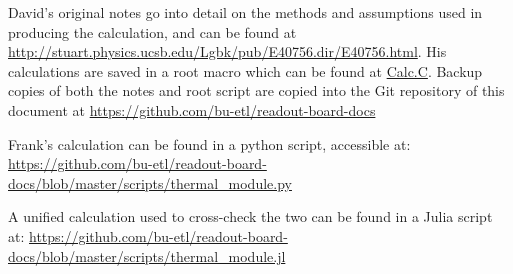 \documentclass[11pt]{article}
\begin{document}
David's original notes go into detail on the methods and assumptions used in producing the calculation, and can be found at \url{http://stuart.physics.ucsb.edu/Lgbk/pub/E40756.dir/E40756.html}.
His calculations are saved in a root macro which can be found at \href{http://stuart.physics.ucsb.edu/Lgbk/pub/E40756.dir/Calc.C}{Calc.C}.
Backup copies of both the notes and root script are copied into the Git repository of this document at \url{https://github.com/bu-etl/readout-board-docs}

Frank's calculation can be found in a python script, accessible at: \url{https://github.com/bu-etl/readout-board-docs/blob/master/scripts/thermal_module.py}

A unified calculation used to cross-check the two can be found in a Julia script at:
\url{https://github.com/bu-etl/readout-board-docs/blob/master/scripts/thermal_module.jl}
\end{document}
